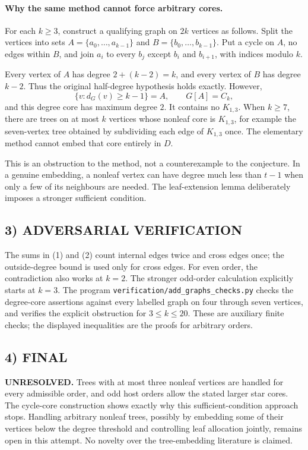 \paragraph{Why the same method cannot force arbitrary cores.}
For each $k\ge3$, construct a qualifying graph on $2k$ vertices as follows. Split the vertices into sets $A=\{a_0,\ldots,a_{k-1}\}$ and $B=\{b_0,\ldots,b_{k-1}\}$. Put a cycle on $A$, no edges within $B$, and join $a_i$ to every $b_j$ except $b_i$ and $b_{i+1}$, with indices modulo $k$.

Every vertex of $A$ has degree $2+(k-2)=k$, and every vertex of $B$ has degree $k-2$. Thus the original half-degree hypothesis holds exactly. However,
\[
\{v:d_G(v)\ge k-1\}=A,\qquad G[A]=C_k,
\]
and this degree core has maximum degree $2$. It contains no $K_{1,3}$. When $k\ge7$, there are trees on at most $k$ vertices whose nonleaf core is $K_{1,3}$, for example the seven-vertex tree obtained by subdividing each edge of $K_{1,3}$ once. The elementary method cannot embed that core entirely in $D$.

This is an obstruction to the method, not a counterexample to the conjecture. In a genuine embedding, a nonleaf vertex can have degree much less than $t-1$ when only a few of its neighbours are needed. The leaf-extension lemma deliberately imposes a stronger sufficient condition.

\subsection{3) ADVERSARIAL VERIFICATION}
The sums in (1) and (2) count internal edges twice and cross edges once; the outside-degree bound is used only for cross edges. For even order, the contradiction also works at $k=2$. The stronger odd-order calculation explicitly starts at $k=3$. The program \texttt{verification/add\_graphs\_checks.py} checks the degree-core assertions against every labelled graph on four through seven vertices, and verifies the explicit obstruction for $3\le k\le20$. These are auxiliary finite checks; the displayed inequalities are the proofs for arbitrary orders.

\subsection{4) FINAL}
\textbf{UNRESOLVED.} Trees with at most three nonleaf vertices are handled for every admissible order, and odd host orders allow the stated larger star cores. The cycle-core construction shows exactly why this sufficient-condition approach stops. Handling arbitrary nonleaf trees, possibly by embedding some of their vertices below the degree threshold and controlling leaf allocation jointly, remains open in this attempt. No novelty over the tree-embedding literature is claimed.

